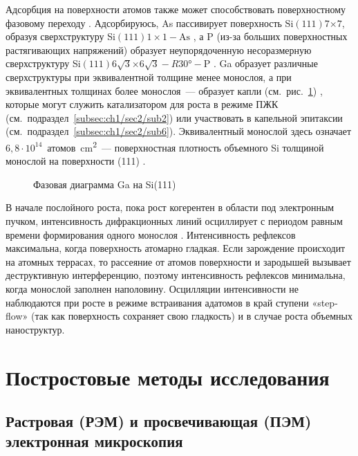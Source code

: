 Адсорбция на поверхности атомов также может способствовать поверхностному фазовому переходу \cite{Bringans1993, Ji2007}. Адсорбируюсь, As пассивирует поверхность Si\((111)7\)\(\times\)\(7\), образуя сверхструктуру Si\((111)1\times1-\text{As}\) \cite{Patel1989, Bringans1992}, а P (из-за больших поверхностных растягивающих напряжений) образует неупорядоченную несоразмерную сверхструктуру Si\((111)6\sqrt{3}\)\(\times\)\(6\sqrt{3}-R30\si{\degree}-\text{P}\) \cite{Vitali1998, Siriwardena2017}. Ga образует различные сверхструктуры при эквивалентной толщине менее монослоя, а при эквивалентных толщинах более монослоя~--- образует капли (см.~рис.~\cref{fig:Image_12}) \cite{Park1988}, которые могут служить катализатором для роста в режиме ПЖК (см.~подраздел~\cref{subsec:ch1/sec2/sub2}) или участвовать в капельной эпитаксии (см.~подраздел~\cref{subsec:ch1/sec2/sub6}). Эквивалентный монослой здесь означает \(6,8 \cdot 10^{14}\)~атомов\si{\per\centi\meter^{2}}~--- поверхностная плотность объемного Si толщиной монослой на поверхности (111) \cite{Kumar2010}.

\begin{figure}[ht]
	\caption{Фазовая диаграмма Ga на Si(111) \cite{Park1988}}\label{fig:Image_12}
\end{figure}

В начале послойного роста, пока рост когерентен в области под электронным пучком, интенсивность дифракционных линий осциллирует с периодом равным времени формирования одного монослоя \cite{Harris1981}. Интенсивность рефлексов максимальна, когда поверхность атомарно гладкая. Если зарождение происходит на атомных террасах, то рассеяние от атомов поверхности и зародышей вызывает деструктивную интерференцию, поэтому интенсивность рефлексов минимальна, когда монослой заполнен наполовину. Осцилляции интенсивности не наблюдаются при росте в режиме встраивания адатомов в край ступени «step-flow» (так как поверхность сохраняет свою гладкость) и в случае роста объемных наноструктур.

\section{Постростовые методы исследования}\label{sec:ch2/sec2}

\subsection{Растровая (РЭМ) и просвечивающая (ПЭМ) электронная микроскопия}\label{subsec:ch2/sec2/sub1}

